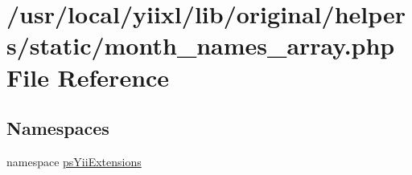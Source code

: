 \hypertarget{month__names__array_8php}{
\section{/usr/local/yiixl/lib/original/helpers/static/month\_\-names\_\-array.php File Reference}
\label{month__names__array_8php}
}
\subsection*{Namespaces}
\begin{DoxyCompactItemize}
\item 
namespace \hyperlink{namespacepsYiiExtensions}{psYiiExtensions}
\end{DoxyCompactItemize}

